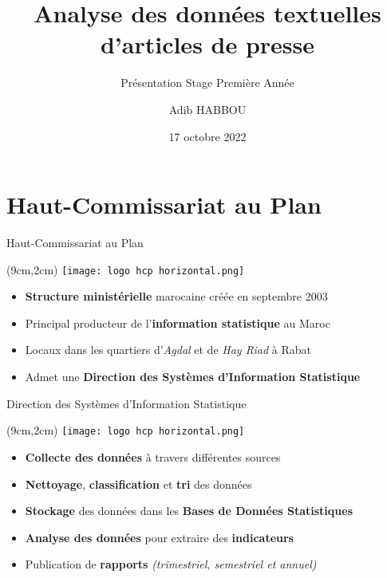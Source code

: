 \documentclass[10pt,sans,usenames,dvipsnames,english,compress]{beamer}
\title{Analyse des données textuelles d'articles de presse}
\subtitle{Présentation Stage Première Année}
\author[Adib HABBOU]{Adib HABBOU}
\date{17 octobre 2022}
\institute[ENSIIE]{Haut-Commissariat au Plan du Maroc}
\begin{document}
\begin{frame}[plain]
	\vspace{0.6cm}
	\begin{minipage}{\textwidth}
		\centering
		\hspace*{2cm}
	\end{minipage}
	\vspace{0.6cm}
	\titlepage
\end{frame}

\section{Haut-Commissariat au Plan}
\begin{frame}{Haut-Commissariat au Plan}
	\begin{textblock*}{3cm}(9cm,2cm) %
		\texttt{[image: logo hcp horizontal.png]}
	\end{textblock*}
 
        \vspace{1cm}
        
	\begin{itemize}
		\item \textbf{Structure ministérielle} marocaine créée en septembre 2003
		\item Principal producteur de l’\textbf{information statistique} au Maroc
            \item Locaux dans les quartiers d'\emph{Agdal} et de \emph{Hay Riad} à Rabat
		\item Admet une \textbf{Direction des Systèmes d’Information Statistique}
	\end{itemize}
\end{frame}

\begin{frame}{Direction des Systèmes d’Information Statistique}
	\begin{textblock*}{3cm}(9cm,2cm) %
		\texttt{[image: logo hcp horizontal.png]}
	\end{textblock*}

	\vspace{1cm}

	\begin{itemize}
		\item \textbf{Collecte des données} à travers différentes sources
            \item \textbf{Nettoyage}, \textbf{classification} et \textbf{tri} des données
            \item \textbf{Stockage} des données dans les \textbf{Bases de Données Statistiques}
            \item \textbf{Analyse des données} pour extraire des \textbf{indicateurs}
            \item Publication de \textbf{rapports} \emph{(trimestriel, semestriel et annuel)}
	\end{itemize}
\end{frame}
\end{document}
